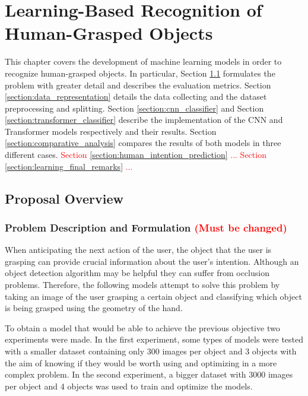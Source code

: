 \chapter{Learning-Based Recognition of Human-Grasped Objects}
\label{chapter:learning}

This chapter covers the development of machine learning models in order to recognize human-grasped objects. In particular, Section \ref{section:proposal_overview} formulates the problem with greater detail and describes the evaluation metrics. Section \ref{section:data_representation} details the data collecting and the dataset preprocessing and splitting. Section \ref{section:cnn_classifier} and Section \ref{section:transformer_classifier} describe the implementation of the CNN and Transformer models respectively and their results. Section \ref{section:comparative_analysis} compares the results of both models in three different cases. \textcolor{red}{Section \ref{section:human_intention_prediction} ... Section \ref{section:learning_final_remarks} ...}

\section{Proposal Overview}
\label{section:proposal_overview}

\subsection{Problem Description and Formulation \textcolor{red}{(Must be changed)}}

When anticipating the next action of the user, the object that the user is grasping can provide crucial information about the user's intention. Although an object detection algorithm may be helpful they can suffer from occlusion problems. Therefore, the following models attempt to solve this problem by taking an image of the user grasping a certain object and classifying which object is being grasped using the geometry of the hand.

To obtain a model that would be able to achieve the previous objective two experiments were made. In the first experiment, some types of models were tested with a smaller dataset containing only 300 images per object and 3 objects with the aim of knowing if they would be worth using and optimizing in a more complex problem. In the second experiment, a bigger dataset with 3000 images per object and 4 objects was used to train and optimize the models.

